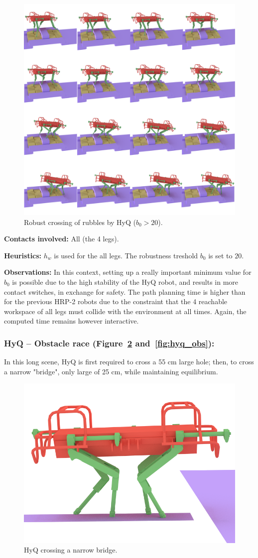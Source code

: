 \begin{figure}
  \centering
  \includegraphics[width=0.5\linewidth]{figures/darpa}
  \caption{
           Robust crossing of rubbles by HyQ ($b_0 > 20$). }
		   \label{fig:darpa}
\end{figure}


\noindent\textbf{Contacts involved:} All (the 4 legs).

\noindent\textbf{Heuristics:} $h_w$ is used for the all legs. The robustness treshold $b_0$ is set to $20$.

\noindent\textbf{Observations:} In this context, setting up a really important minimum value for $b_0$ is possible due to the high
stability of the HyQ robot, and results in more contact switches, in exchange for safety. The path planning time is higher than for the previous HRP-2 robots due to the constraint that the 4 reachable workspace of all legs must
collide with the environment at all times. Again, the computed time remains however interactive.

\subsubsection{HyQ -- Obstacle race (Figure~\ref{fig:hyq_bridge} and~\ref{fig:hyq_obs}):}
In this long scene, HyQ is first required to cross a 55 cm large hole; then, to cross a narrow "bridge", only large of 25 cm,
while maintaining equilibrium.

\begin{figure}
  \centering
  \includegraphics[width=0.4\linewidth]{figures/hyq_bridge}
  \caption{
           HyQ crossing a narrow bridge. }
		   \label{fig:hyq_bridge}
\end{figure}

